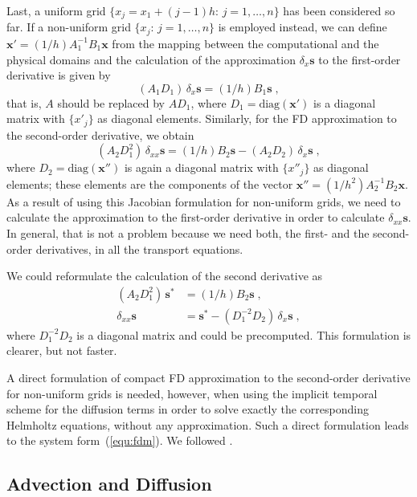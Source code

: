 Last, a uniform grid $\{x_j=x_1+(j-1)h:\, j = 1,\ldots,n\}$ has been considered so far. If a non-uniform grid $\{x_j:\, j = 1,\ldots,n\}$ is employed instead, we can define $\mathbf{x'} = (1/h)A_1^{-1}B_1\mathbf{x}$ from the mapping between the computational and the physical domains and the calculation of the approximation $\delta_{x} \mathbf{s}$ to the first-order derivative is given by
\begin{equation}
  (A_1D_1)\, \delta_x \mathbf{s}=(1/h)B_1 \mathbf{s} \;,
\end{equation}
that is, $A$ should be replaced by $AD_1$, where $D_1=\text{diag} (\mathbf{x'})$ is a diagonal matrix with $\{x'_j\}$ as diagonal elements. Similarly, for the FD approximation to the second-order derivative, we obtain
\begin{equation}
  (A_2D_1^2)\, \delta_{xx} \mathbf{s}=(1/h)B_2 \mathbf{s} - (A_2D_2)\,\delta_x
  \mathbf{s} \;,
\end{equation}
where $D_2=\text{diag} (\mathbf{x''})$ is again a diagonal matrix with
$\{x''_j\}$ as diagonal elements; these elements are the components of the vector $\mathbf{x''} = (1/h^2)A_2^{-1}B_2\mathbf{x}$. As a result of using this Jacobian formulation for non-uniform grids, we need to calculate the approximation to the first-order derivative in order to calculate $\delta_{xx} \mathbf{s}$. In general, that is not a problem because we need both, the first- and the second-order derivatives, in all the transport equations.

We could reformulate the calculation of the second derivative as
\begin{subequations}
  \begin{align}
    (A_2D_1^2)\, \mathbf{s}^*&=(1/h)B_2 \mathbf{s} \;,\\
    \delta_{xx} \mathbf{s}&= \mathbf{s}^*- (D_1^{-2}D_2)\,\delta_x  \mathbf{s} \;,
  \end{align}
\end{subequations}
where $D_1^{-2}D_2$ is a diagonal matrix and could be precomputed. This formulation is clearer, but not faster.

A direct formulation of compact FD approximation to the second-order derivative for non-uniform grids is needed, however, when using the implicit temporal scheme for the diffusion terms in order to solve exactly the corresponding Helmholtz equations, without any approximation. Such a direct formulation leads to the system form~(\ref{equ:fdm}). We followed \cite{Shukla:2005}.

\subsection{Advection and Diffusion}

